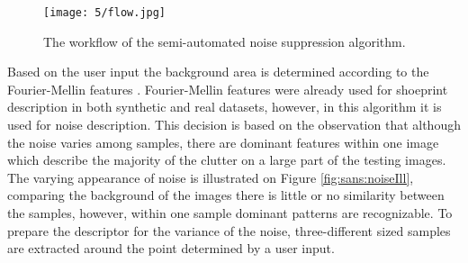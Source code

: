 \documentclass[draft,final]{vutinfth} %
\begin{document}
\begin{figure}[h]
  \centering
  \texttt{[image: 5/flow.jpg]}
  \caption{The workflow of the semi-automated noise suppression algorithm.}
  \label{fig:sans:workflow} %
\end{figure}

\par
Based on the user input the background area is determined according to the Fourier-Mellin features \cite{sheng1986circular}.
Fourier-Mellin features were already used for shoeprint description in both synthetic \cite{gueham2008automatic} and real \cite{wu2019crime} datasets, however, in this algorithm it is used for noise description.
This decision is based on the observation that although the noise varies among samples, there are dominant features within one image which describe the majority of the clutter on a large part of the testing images.
The varying appearance of noise is illustrated on Figure \ref{fig:sans:noiseIll}, comparing the background of the images there is little or no similarity between the samples, however, within one sample dominant patterns are recognizable.
To prepare the descriptor for the variance of the noise, three-different sized samples are extracted around the point determined by a user input.
\end{document}
